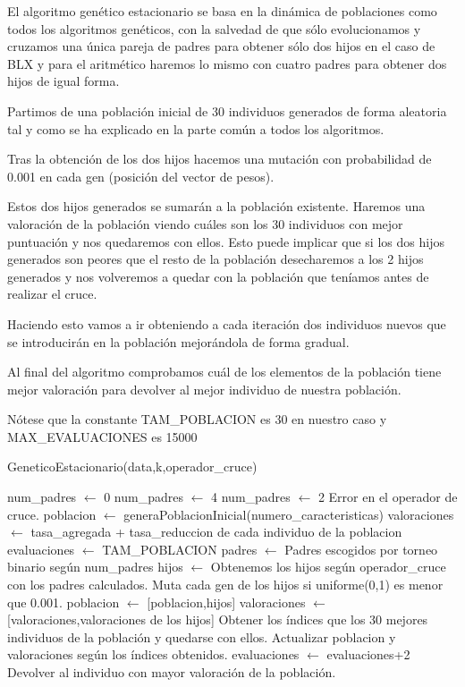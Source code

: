 \documentclass[12pt,a4paper]{article}
\begin{document}
	El algoritmo genético estacionario se basa en la dinámica de poblaciones como todos los algoritmos genéticos, con la salvedad de que sólo evolucionamos y cruzamos una única pareja de padres para obtener sólo dos hijos en el caso de BLX y para el aritmético haremos lo mismo con cuatro padres para obtener dos hijos de igual forma.

	Partimos de una población inicial de 30 individuos generados de forma aleatoria tal y como se ha explicado en la parte común a todos los algoritmos.

	Tras la obtención de los dos hijos hacemos una mutación con probabilidad de 0.001 en cada gen (posición del vector de pesos).

	Estos dos hijos generados se sumarán a la población existente. Haremos una valoración de la población viendo cuáles son los 30 individuos con mejor puntuación y nos quedaremos con ellos. Esto puede implicar que si los dos hijos generados son peores que el resto de la población desecharemos a los 2 hijos generados y nos volveremos a quedar con la población que teníamos antes de realizar el cruce.

	Haciendo esto vamos a ir obteniendo a cada iteración dos individuos nuevos que se introducirán en la población mejorándola de forma gradual.

	Al final del algoritmo comprobamos cuál de los elementos de la población tiene mejor valoración para devolver al mejor individuo de nuestra población.

	Nótese que la constante TAM\_POBLACION es 30 en nuestro caso y MAX\_EVALUACIONES es 15000

	\begin{algorithm}
		\caption{GeneticoEstacionario(data,k,operador\_cruce)}
		\begin{algorithmic}
			\STATE num\_padres $\leftarrow$ 0
				\STATE num\_padres $\leftarrow$ 4
				\STATE num\_padres $\leftarrow$ 2
			\ELSE
				\STATE Error en el operador de cruce.
			\ENDIF
			\STATE
			\STATE poblacion $\leftarrow$ generaPoblacionInicial(numero\_caracteristicas)
			\STATE valoraciones $\leftarrow$ tasa\_agregada + tasa\_reduccion de cada individuo de la poblacion
			\STATE evaluaciones $\leftarrow$ TAM\_POBLACION
				\STATE padres $\leftarrow$ Padres escogidos por torneo binario según num\_padres
				\STATE hijos $\leftarrow$ Obtenemos los hijos según operador\_cruce con los padres calculados.
				\STATE
				\STATE Muta cada gen de los hijos si uniforme(0,1) es menor que 0.001.
				\STATE poblacion $\leftarrow$ [poblacion,hijos]
				\STATE valoraciones $\leftarrow$ [valoraciones,valoraciones de los hijos]
				\STATE Obtener los índices que los 30 mejores individuos de la población y quedarse con ellos.
				\STATE Actualizar poblacion y valoraciones según los índices obtenidos.
				\STATE evaluaciones $\leftarrow$ evaluaciones+2
			\ENDWHILE
			\RETURN Devolver al individuo con mayor valoración de la población.
		\end{algorithmic}
	\end{algorithm}
\end{document}
